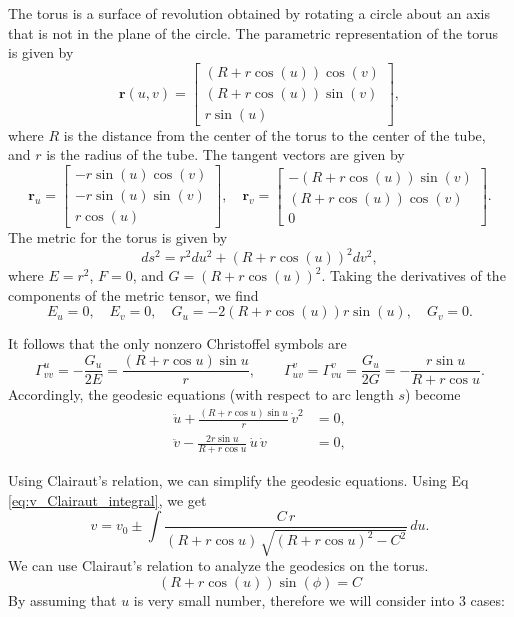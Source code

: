 \documentclass[12pt]{article}
\begin{document}
The torus is a surface of revolution obtained by rotating a circle about an axis that is not in the plane of the circle.
The parametric representation of the torus is given by
\[
    \mathbf{r}(u, v) = \begin{bmatrix} (R + r \cos (u)) \cos (v) \\ (R + r \cos (u)) \sin (v) \\ r \sin (u) \end{bmatrix},
\]
where \(R\) is the distance from the center of the torus to the center of the tube, and \(r\) is the radius of the tube.
The tangent vectors are given by
\[
    \mathbf{r}_u = \begin{bmatrix} -r \sin (u) \cos (v) \\ -r \sin (u) \sin (v) \\ r \cos (u) \end{bmatrix}, \quad \mathbf{r}_v = \begin{bmatrix} -(R + r \cos (u)) \sin (v) \\ (R + r \cos (u)) \cos (v) \\ 0 \end{bmatrix}.
\]
The metric for the torus is given by
\[
    ds^2 = r^2 du^2 + (R + r \cos (u))^2 dv^2,
\]
where \(E = r^2\), \(F = 0\), and \(G = (R + r \cos (u))^2\).
Taking the derivatives of the components of the metric tensor, we find
\[
    E_u = 0, \quad E_v = 0, \quad G_u = -2(R + r \cos (u))r \sin (u), \quad G_v = 0.
\]

It follows that the only nonzero Christoffel symbols are
\[
  \Gamma^u_{vv}
    =-\frac{G_u}{2E}
    =\frac{(R+r\cos u)\sin u}{r},
  \qquad
  \Gamma^v_{uv}
    =\Gamma^v_{vu}
    =\frac{G_u}{2G}
    =-\frac{r\sin u}{R+r\cos u}.
\]
Accordingly, the geodesic equations (with respect to arc length \(s\)) become
\begin{align*}
  \ddot u + \frac{(R+r\cos u)\sin u}{r}\,\dot v^2 &= 0,\\
  \ddot v - \frac{2r\sin u}{R+r\cos u}\,\dot u\,\dot v &= 0,
\end{align*}

Using Clairaut's relation, we can simplify the geodesic equations.
Using Eq \eqref{eq:v_Clairaut_integral}, we get
\[
  v = v_0\pm\int \frac{C\,r}{(R+r\cos u)\,\sqrt{(R+r\cos u)^2 - C^2}} \,du.
\]
We can use Clairaut's relation to analyze the geodesics on the torus.
\[
    (R + r \cos (u)) \sin(\phi) = C
\]
By assuming that $u$ is very small number, therefore we will consider into 3 cases:
\end{document}
